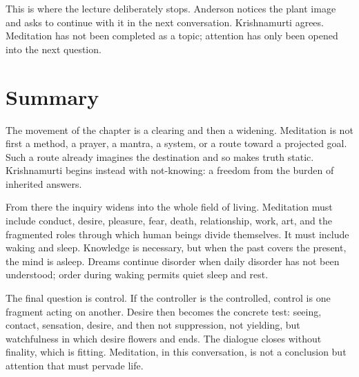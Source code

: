 \begin{figure}
\centering
{}
\end{figure}

This is where the lecture deliberately stops. Anderson notices the plant image and asks to continue with it in the next conversation. Krishnamurti agrees. Meditation has not been completed as a topic; attention has only been opened into the next question.

\section{Summary}

The movement of the chapter is a clearing and then a widening. Meditation is not first a method, a prayer, a mantra, a system, or a route toward a projected goal. Such a route already imagines the destination and so makes truth static. Krishnamurti begins instead with not-knowing: a freedom from the burden of inherited answers.

From there the inquiry widens into the whole field of living. Meditation must include conduct, desire, pleasure, fear, death, relationship, work, art, and the fragmented roles through which human beings divide themselves. It must include waking and sleep. Knowledge is necessary, but when the past covers the present, the mind is asleep. Dreams continue disorder when daily disorder has not been understood; order during waking permits quiet sleep and rest.

The final question is control. If the controller is the controlled, control is one fragment acting on another. Desire then becomes the concrete test: seeing, contact, sensation, desire, and then not suppression, not yielding, but watchfulness in which desire flowers and ends. The dialogue closes without finality, which is fitting. Meditation, in this conversation, is not a conclusion but attention that must pervade life.